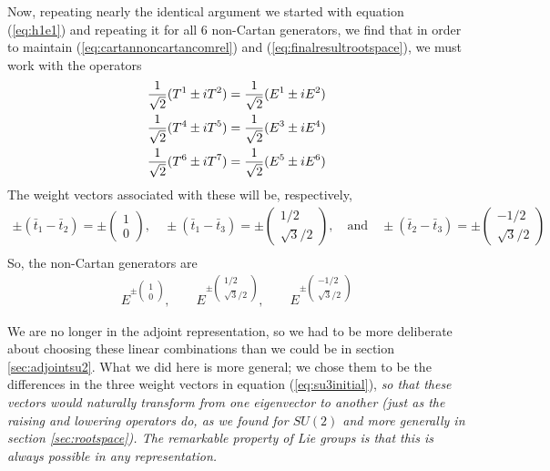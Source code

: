 \documentclass[12pt,epsf]{article}
\def\nolabel{\nonumber }
\def\nolabel{\nonumber }
\begin{document}
Now, repeating nearly the identical argument we started with equation
(\ref{eq:h1e1}) and repeating it for all 6 non-Cartan generators, we
find that in order to maintain (\ref{eq:cartannoncartancomrel}) and
(\ref{eq:finalresultrootspace}), we must work with the operators
\begin{eqnarray}
{1\over \sqrt{2}}(T^1\pm iT^2) = {1\over \sqrt{2}}(E^1\pm i E^2)
\nolabel \\
{1\over \sqrt{2}}(T^4 \pm i T^5) = {1\over \sqrt{2}}(E^3 \pm i E^4)
\nolabel \\
{1\over \sqrt{2}}(T^6\pm iT^7) = {1\over \sqrt{2}}(E^5 \pm i E^6)
\label{eq:gluons}
\end{eqnarray}
The weight vectors associated with these will be, respectively,
\begin{eqnarray}
\pm (\bar t_1 - \bar t_2) = \pm 
\begin{pmatrix}
1 \\ 0
\end{pmatrix}, \quad \pm (\bar t_1 - \bar t_3) = \pm 
\begin{pmatrix}
1/2 \\ \sqrt{3}/2
\end{pmatrix}, \quad \mbox{and} \quad \pm (\bar t_2 - \bar t_3) = \pm
\begin{pmatrix}
-1/2 \\ \sqrt{3}/2
\end{pmatrix} \nolabel\\ \label{eq:su3noncartan}
\end{eqnarray}
So, the non-Cartan generators are 
\begin{eqnarray}
E^{\pm
\begin{pmatrix}
1 \\ 0
\end{pmatrix}}, \qquad E^{\pm
\begin{pmatrix}
1/2 \\ \sqrt{3}/2
\end{pmatrix}}, \qquad E^{\pm
\begin{pmatrix}
-1/2 \\ \sqrt{3}/2
\end{pmatrix}}\nolabel
\end{eqnarray}

We are no longer in the adjoint representation, so we had to be more
deliberate about choosing these linear combinations than we could be in
section \ref{sec:adjointsu2}.  What we did here is more general; we
chose them to be the differences in the three weight vectors in
equation (\ref{eq:su3initial}), \it so that \rm these vectors would
naturally transform from one eigenvector to another (just as the
raising and lowering operators do, as we found for $SU(2)$ and more
generally in section \ref{sec:rootspace}).  The remarkable property of
Lie groups is that this is always possible in any representation.  
\end{document}
